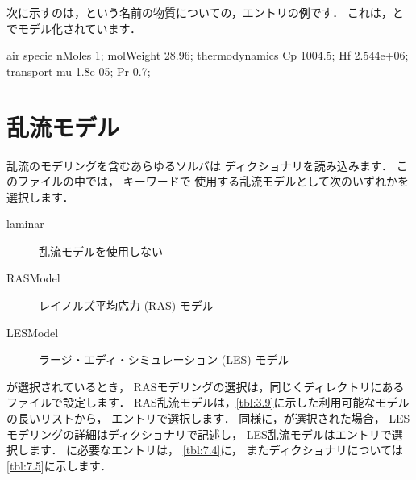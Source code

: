 次に示すのは，という名前の物質についての，エントリの例です．
これは，とでモデル化されています．
\begin{OFverbatim}[file]
air
{
    specie
    {
        nMoles          1;
        molWeight       28.96;
    }
    thermodynamics
    {
        Cp              1004.5;
        Hf              2.544e+06;
    }
    transport
    {
        mu              1.8e-05;
        Pr              0.7;
    }
}
\end{OFverbatim}



\section{乱流モデル}
\label{sec:7.2}
乱流のモデリングを含むあらゆるソルバは
%
%
ディクショナリを読み込みます．
このファイルの中では，
%
%
キーワードで
使用する乱流モデルとして次のいずれかを選択します．
\begin{description}
 \item[laminar]
%
%
            乱流モデルを使用しない
 \item[RASModel]
%
%
            レイノルズ平均応力 (RAS) モデル
 \item[LESModel]
%
%
            ラージ・エディ・シミュレーション (LES) モデル
\end{description}

が選択されているとき，
RASモデリングの選択は，同じくディレクトリにある
ファイルで設定します．
RAS乱流モデルは，\autoref{tbl:3.9}に示した利用可能なモデルの長いリストから，
エントリで選択します．
同様に，が選択された場合，
LESモデリングの詳細はディクショナリで記述し，
LES乱流モデルはエントリで選択します．
に必要なエントリは，
\autoref{tbl:7.4}に，
またディクショナリについては
\autoref{tbl:7.5}に示します．


